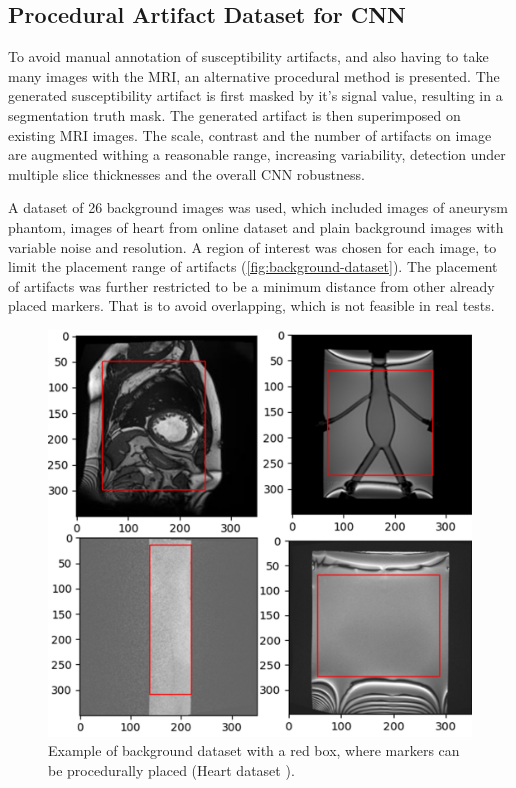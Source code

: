 \documentclass[conference]{IEEEtran}
\begin{document}
\subsection{Procedural Artifact Dataset for CNN}\label{artifact-cnn-dataset}
To avoid manual annotation of susceptibility artifacts, and also having to take many images with the MRI, an alternative procedural method is presented. The generated susceptibility artifact is first masked by it's signal value, resulting in a segmentation truth mask. The generated artifact is then superimposed on existing MRI images. The scale, contrast and the number of artifacts on image are augmented withing a reasonable range, increasing variability, detection under multiple slice thicknesses and the overall CNN robustness.

A dataset of 26 background images was used, which included images of aneurysm phantom, images of heart from online dataset and plain background images with variable noise and resolution. A region of interest was chosen for each image, to limit the placement range of artifacts (\autoref{fig:background-dataset}). The placement of artifacts was further restricted to be a minimum distance from other already placed markers. That is to avoid overlapping, which is not feasible in real tests.


\begin{figure}
    \centering
    \includegraphics[width=1\linewidth]{Conference//img/roi-example-background-dataset.png}
    \caption{Example of background dataset with a red box, where markers can be procedurally placed (Heart dataset \cite{pmid29994302}).}
    \label{fig:background-dataset}
\end{figure}
\end{document}

